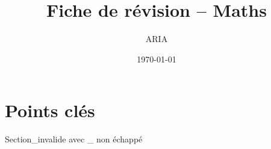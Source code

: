 \documentclass[11pt,a4paper]{article}
\title{Fiche de révision – Maths}
\author{ARIA}
\date{\today}
\begin{document}
            \nonstopmode
            \maketitle
            \tableofcontents
            \newpage
            \section*{Points clés}
            Section_invalide avec _ non échappé
            
\end{document}
